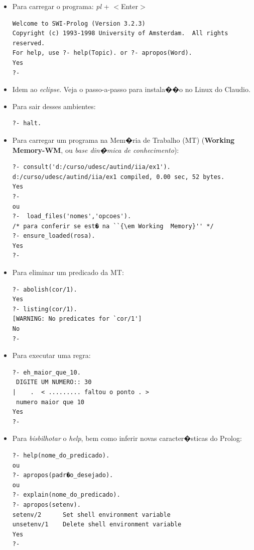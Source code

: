 \documentclass[final,a4paper]{article}
\begin{document}
\begin{itemize}
\item Para carregar o programa: {\em pl} +
$<$Enter$>$
\begin{verbatim}
Welcome to SWI-Prolog (Version 3.2.3)
Copyright (c) 1993-1998 University of Amsterdam.  All rights reserved.
For help, use ?- help(Topic). or ?- apropos(Word).
Yes
?-
\end{verbatim}

\item Idem ao {\em eclipse}. Veja o passo-a-passo
para instala��o no Linux do Claudio.

\item  Para sair desses ambientes:
\begin{verbatim}
?- halt.
\end{verbatim}

\item Para carregar um programa na
Mem�ria de Trabalho (MT) ({\bf Working
Memory-WM}, ou {\em base din�mica de
conhecimento}):

{\small 
\begin{verbatim}
?- consult('d:/curso/udesc/autind/iia/ex1').
d:/curso/udesc/autind/iia/ex1 compiled, 0.00 sec, 52 bytes.
Yes
?-
ou
?-  load_files('nomes','opcoes').
/* para conferir se est� na ``{\em Working  Memory}'' */
?- ensure_loaded(rosa).
Yes
?-
\end{verbatim}
}

\item Para eliminar um predicado da MT:
\begin{verbatim}
?- abolish(cor/1).
Yes
?- listing(cor/1).
[WARNING: No predicates for `cor/1']
No
?-
\end{verbatim}

\item Para executar uma regra:
\begin{verbatim}
?- eh_maior_que_10.
 DIGITE UM NUMERO:: 30
|    .  < ......... faltou o ponto . >
 numero maior que 10
Yes
?-
\end{verbatim}
\item Para {\em bisbilhotar} o {\em help},  bem como
inferir novas caracter�sticas do Prolog:

\begin{verbatim}
?- help(nome_do_predicado).
ou
?- apropos(padr�o_desejado).
ou
?- explain(nome_do_predicado).
?- apropos(setenv).
setenv/2      Set shell environment variable
unsetenv/1    Delete shell environment variable
Yes
?-
\end{verbatim}


\end{itemize}
\end{document}
